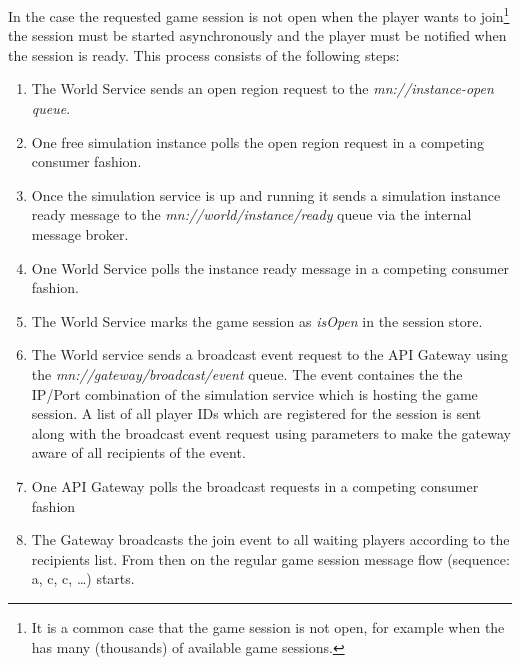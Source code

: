 In the case the requested game session is not open when the player wants to
join\footnote{It is a common case that the game session is not open, for
example when the \og{} has many (thousands) of available game sessions.} the
session must be started asynchronously and the player must be notified when the
session is ready. This process consists of the following steps:



\begin{enumerate}[label=\Alph*.]
    \item The World Service sends an open region request to the
    \textit{mn://instance-open queue}.
    \item One free simulation instance polls the open region request in a
    competing consumer fashion.
    \item Once the simulation service is up and running it sends a simulation
    instance ready message to the \textit{mn://world/instance/ready} queue via
    the internal message broker.
    \item One World Service polls the instance ready message in a competing
    consumer fashion.
    \item The World Service marks the game session as \textit{isOpen} in the
    session store.
    \item The World service sends a broadcast event request to the API Gateway
    using the \textit{mn://gateway/broadcast/event} queue. The event containes
    the the IP/Port combination of the simulation service which is hosting the
    game session. A list of all player IDs  which are registered for the
    session is sent along with the broadcast event request using parameters to
    make the gateway aware of all recipients of the event.
    \item One API Gateway polls the broadcast requests in a competing consumer
    fashion \item The Gateway broadcasts the join event to all waiting players
    according to the recipients list. From then on the regular game session
    message flow (sequence: a, c, c, \ldots) starts.
\end{enumerate}




